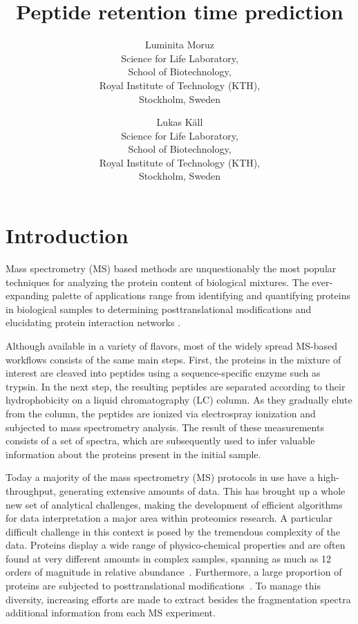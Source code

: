 \documentclass[a4paper]{article}
\title{Peptide retention time prediction}
\author{
Luminita Moruz\\
Science for Life Laboratory,\\
School of Biotechnology,\\
Royal Institute of Technology (KTH),\\
Stockholm, Sweden
\and
Lukas K\"{a}ll\\
Science for Life Laboratory,\\
School of Biotechnology,\\
Royal Institute of Technology (KTH),\\
Stockholm, Sweden}
\begin{document}
\maketitle

\setcounter{secnumdepth}{2} %
\setcounter{tocdepth}{2}    %
\tableofcontents            %

\setlength{\parskip}{0.15cm}

\section{Introduction}

Mass spectrometry (MS) based methods are unquestionably the most
popular techniques for analyzing the protein content of biological
mixtures.  The ever-expanding palette of applications range from
identifying and quantifying proteins in biological samples
\cite{Geiger2012} to determining posttranslational modifications
\cite{Huttlin2010} and elucidating protein interaction networks
\cite{Gavin2011}.

Although available in a variety of flavors, most of the widely spread
MS-based workflows consists of the same main steps. First, the
proteins in the mixture of interest are cleaved into peptides using a
sequence-specific enzyme such as trypsin. In the next step, the
resulting peptides are separated according to their hydrophobicity on
a liquid chromatography (LC) column. As they gradually elute from the
column, the peptides are ionized via electrospray ionization and
subjected to mass spectrometry analysis. The result of these
measurements consists of a set of spectra, which are subsequently used
to infer valuable information about the proteins present in the
initial sample.

Today a majority of the mass spectrometry (MS) protocols in use have a
high-throughput, generating extensive amounts of data. This has
brought up a whole new set of analytical challenges, making the
development of efficient algorithms for data interpretation a major
area within proteomics research. A particular difficult challenge in
this context is posed by the tremendous complexity of the data.
Proteins display a wide range of physico-chemical properties and are
often found at very different amounts in complex samples, spanning as
much as 12 orders of magnitude in relative abundance~\cite{Angel2012}.
Furthermore, a large proportion of proteins are subjected to
posttranslational modifications~\cite{Lemeer2009}. To manage this
diversity, increasing efforts are made to extract besides the
fragmentation spectra additional information from each MS experiment.
\end{document}

